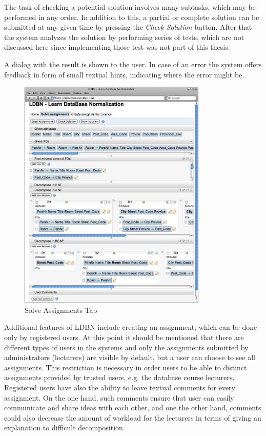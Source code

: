 The task of checking a potential solution
involves many subtasks, which may be performed in any order. In addition to this,  
a partial or complete 
solution can be submitted at any given time by pressing the \textit{Check Solution} button. 
After that the system analyzes the solution by performing series of tests, which are not
discussed here since implementing those test was not part of this thesis. 

A dialog with the result is shown to the user. In case of an error the system offers
feedback in form of small textual hints, indicating
where the error might be. 

\begin{figure}[h]
	\begin{center}
		\includegraphics[width=0.8\textwidth]{./img/screen01b.png}
		\caption{Solve Assignments Tab}
		\label{fig:screen01}
	\end{center}
\end{figure}

Additional features of LDBN include creating an assignment, which can be done 
only by registered users. At this point it should be mentioned that
there are different types of users in the systems and only the assignments
submitted by administrators (lecturers) are visible by default, but a user can
choose to see all assignments. This restriction is necessary in order users to be able 
to distinct assignments provided by trusted users, e.g. the database course
lecturers. Registered users have also the ability to leave textual comments 
for every assignment. On the one hand, such
comments ensure that user can easily communicate and share ideas
with each other, and one the other hand, comments could also decrease the amount of workload
for the lecturers in terms of giving an explanation to difficult decomposition.

